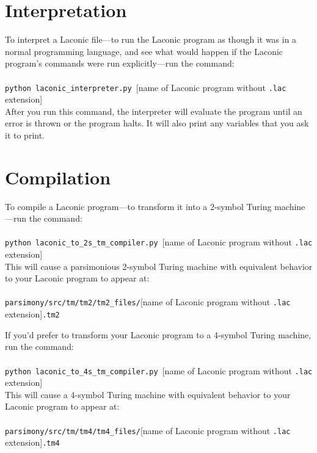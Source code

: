 \documentclass[11pt]{article}
\begin{document}
\section{Interpretation}

To interpret a Laconic file---to run the Laconic program as though it was in a normal programming language, and see what would happen if the Laconic program's commands were run explicitly---run the command: \\ \\ 
\texttt{python laconic_interpreter.py }[name of Laconic program without \texttt{.lac} extension] \\

After you run this command, the interpreter will evaluate the program until an error is thrown or the program halts. It will also print any variables that you ask it to print.

\section{Compilation}

To compile a Laconic program---to transform it into a 2-symbol Turing machine---run the command: \\ \\
\texttt{python laconic_to_2s_tm_compiler.py }[name of Laconic program without \texttt{.lac} extension] \\

This will cause a parsimonious 2-symbol Turing machine with equivalent behavior to your Laconic program to appear at: \\ \\
\texttt{parsimony/src/tm/tm2/tm2_files/}[name of Laconic program without \texttt{.lac} extension]\texttt{.tm2}

If you'd prefer to transform your Laconic program to a 4-symbol Turing machine, run the command: \\ \\
\texttt{python laconic_to_4s_tm_compiler.py }[name of Laconic program without \texttt{.lac} extension] \\

This will cause a 4-symbol Turing machine with equivalent behavior to your Laconic program to appear at: \\ \\
\texttt{parsimony/src/tm/tm4/tm4_files/}[name of Laconic program without \texttt{.lac} extension]\texttt{.tm4} \\
\end{document}
